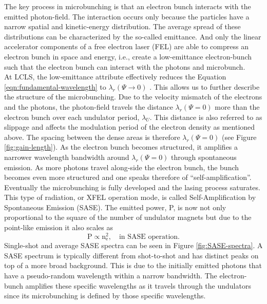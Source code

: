 %
The key process in microbunching is that an electron bunch interacts with the emitted photon-field. The interaction occurs only because the particles have a narrow spatial and kinetic-energy distribution. The average spread of these distributions can be characterized by the so-called emittance. And only the linear accelerator components of a free electron laser (FEL) are able to compress an electron bunch in space and energy, i.e., create a low-emittance electron-bunch such that the electron bunch can interact with the photons and microbunch.\\[1\baselineskip]
%
At LCLS, the low-emittance attribute effectively reduces the Equation \ref{eqn:fundamental-wavelength} to $\lambda_{r}(\Psi \rightarrow 0)$ \cite{Bucksbaum-2011-Book}. This allows us to further describe the structure of the microbunching. Due to the velocity mismatch of the electrons and the photons, the photon-field travels the distance $\lambda_{r}(\Psi = 0)$ more than the electron bunch over each undulator period, $\lambda_{U}$. This distance is also referred to as slippage and affects the modulation period of the electron density as mentioned above. The spacing between the dense areas is therefore $\lambda_{r}(\Psi = 0)$ (see Figure \ref{fig:gain-length}). As the electron bunch becomes structured, it amplifies a narrower wavelength bandwidth around $\lambda_{r}(\Psi = 0)$ through spontaneous emission. As more photons travel along-side the electron bunch, the bunch becomes even more structured and one speaks therefore of ``self-amplification''. Eventually the microbunching is fully developed and the lasing process saturates.\\[1\baselineskip]
%
This type of radiation, or XFEL operation mode, is called Self-Amplification by Spontaneous Emission (SASE). The emitted power, P, is now not only proportional to the square of the number of undulator magnets but due to the point-like emission it also scales as \citep{Als-Nielson-2011-JWS}
\begin{equation}
\text{P} \propto \text{n}_{\text{e}}^{2},\quad \text{in SASE operation.}
\end{equation}
Single-shot and average SASE spectra can be seen in Figure \ref{fig:SASE-spectra}. A SASE spectrum is typically different from shot-to-shot and has distinct peaks on top of a more broad background. This is due to the initially emitted photons that have a pseudo-random wavelength within a narrow bandwidth. The electron-bunch amplifies these specific wavelengths as it travels through the undulators since its microbunching is defined by those specific wavelengths.\\[1\baselineskip]
